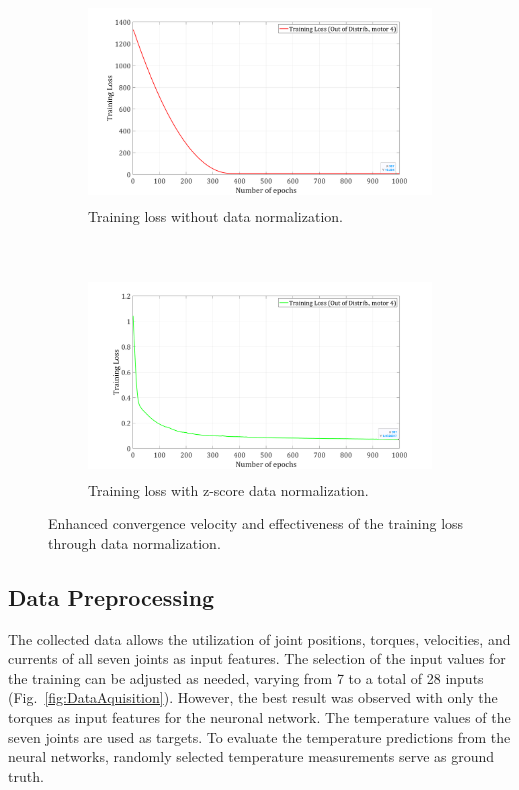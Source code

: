 \documentclass{ifacconf}
\begin{document}
\begin{figure}[t!]
	\centering
	\begin{subfigure}[b]{1.\columnwidth}
		\centering
		\includegraphics[height=2.1in]{./pictures/applications/Unormalized.png}
		\caption{Training loss without data normalization.}
	\end{subfigure}%
	~ 
	\begin{subfigure}[b]{1.\columnwidth}
		\centering
		\includegraphics[height=2.1in]{./pictures/applications/Normalized.png}
		\caption{Training loss with z-score data normalization.}
	\end{subfigure}
	\caption{Enhanced  convergence velocity and effectiveness of the training loss through data normalization.}
	\label{trainingloss}
\end{figure}


\subsection{Data Preprocessing}
The collected data allows the utilization of joint positions, torques, velocities, and currents of all seven joints as input features.
The selection of the input values for the training can be adjusted as needed, varying from 7 to a total of 28 inputs (Fig.~\ref{fig:DataAquisition}). However, the best result was observed with only the torques as input features for the neuronal network. The temperature values of the seven joints are used as targets.
To evaluate the temperature predictions from the neural networks, randomly selected temperature measurements serve as ground truth.
\end{document}
